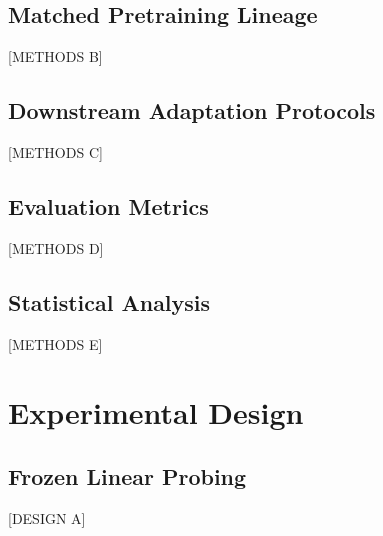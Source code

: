 \documentclass[journal]{IEEEtran}
\begin{document}
\subsection{Matched Pretraining Lineage}
[METHODS B]

\subsection{Downstream Adaptation Protocols}
[METHODS C]

\subsection{Evaluation Metrics}
[METHODS D]

\subsection{Statistical Analysis}
%
[METHODS E]

\section{Experimental Design}

\subsection{Frozen Linear Probing}
[DESIGN A]
\end{document}
